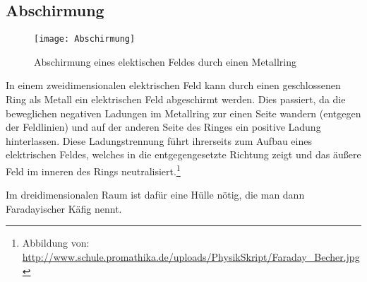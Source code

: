 




%
%	





\subsection{Abschirmung}

\begin{figure}[!h]
	\texttt{[image: Abschirmung]}
	\caption{Abschirmung eines elektischen Feldes durch einen Metallring}
	\label{fig:abschrimung}
\end{figure}

In einem zweidimensionalen elektrischen Feld kann durch einen geschlossenen Ring als Metall ein elektrischen Feld abgeschirmt werden. Dies passiert, da die beweglichen negativen Ladungen im Metallring zur einen Seite wandern (entgegen der Feldlinien) und auf der anderen Seite des Ringes ein positive Ladung hinterlassen. Diese Ladungstrennung führt ihrerseits zum Aufbau eines elektrischen Feldes, welches in die entgegengesetzte Richtung zeigt und das \glqq äußere\grqq{} Feld im inneren des Rings neutralisiert.\footnote{Abbildung von: \url{http://www.schule.promathika.de/uploads/PhysikSkript/Faraday_Becher.jpg}}

Im dreidimensionalen Raum ist dafür eine Hülle nötig, die man dann \glqq Faradayischer Käfig\grqq{} nennt.